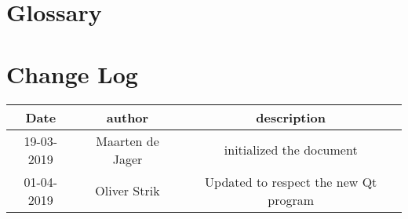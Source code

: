 \documentclass{article}
\begin{document}
\section*{Glossary}


\section*{Change Log}

\begin{tabular}{|c|c|c|}
     \hline
     Date& author & description \\
     \hline
     19-03-2019 & Maarten de Jager & initialized the document \\
     \hline
     01-04-2019 & Oliver Strik & Updated to respect the new Qt program \\
     \hline
\end{tabular}
\end{document}

